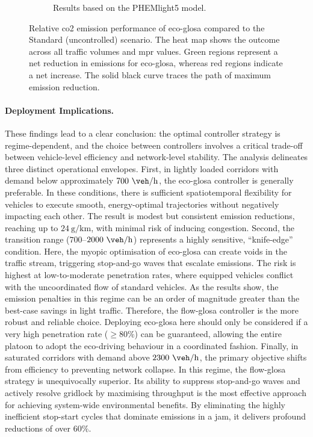 \begin{figure}[htb]
\begin{subfigure}[b]{0.45\textwidth}
    \caption{Results based on the PHEMlight5 model.}
    \label{fig:BE_EcoStd_PHEM}
  \end{subfigure}
  \caption[Relative CO2 performance of Eco-GLOSA vs. Standard]{Relative \ac{co2} emission performance of \ac{eco-glosa} compared to the Standard (uncontrolled) scenario. The heat map shows the outcome across all traffic volumes and \ac{mpr} values. Green regions represent a net reduction in emissions for \ac{eco-glosa}, whereas red regions indicate a net increase. The solid black curve traces the path of maximum emission reduction.}
  \label{fig:BE_EcoStd}
\end{figure}

\paragraph{Deployment Implications.}
These findings lead to a clear conclusion: the optimal controller strategy is regime-dependent, and the choice between controllers involves a critical trade-off between vehicle-level efficiency and network-level stability. The analysis delineates three distinct operational envelopes.
\mynewline
First, in lightly loaded corridors with demand below approximately $700~\unit{\veh\per\hour}$, the \ac{eco-glosa} controller is generally preferable. In these conditions, there is sufficient spatiotemporal flexibility for vehicles to execute smooth, energy-optimal trajectories without negatively impacting each other. The result is modest but consistent emission reductions, reaching up to $24~\unit{\gram\per\kilo\metre}$, with minimal risk of inducing congestion.
\mynewline
Second, the transition range ($700$--$2000~\unit{\veh\per\hour}$) represents a highly sensitive, \enquote{knife-edge} condition. Here, the myopic optimisation of \ac{eco-glosa} can create voids in the traffic stream, triggering stop-and-go waves that escalate emissions. The risk is highest at low-to-moderate penetration rates, where equipped vehicles conflict with the uncoordinated flow of standard vehicles. As the results show, the emission penalties in this regime can be an order of magnitude greater than the best-case savings in light traffic. Therefore, the \ac{flow-glosa} controller is the more robust and reliable choice. Deploying \ac{eco-glosa} here should only be considered if a very high penetration rate ($\geq 80\%$) can be guaranteed, allowing the entire platoon to adopt the eco-driving behaviour in a coordinated fashion.
\mynewline
Finally, in saturated corridors with demand above $2300~\unit{\veh\per\hour}$, the primary objective shifts from efficiency to preventing network collapse. In this regime, the \ac{flow-glosa} strategy is unequivocally superior. Its ability to suppress stop-and-go waves and actively resolve gridlock by maximising throughput is the most effective approach for achieving system-wide environmental benefits. By eliminating the highly inefficient stop-start cycles that dominate emissions in a jam, it delivers profound reductions of over $60\%$.

